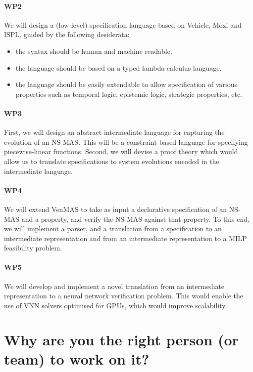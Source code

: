 \documentclass[11pt]{article}
\begin{document}
\paragraph{WP2} We will design a (low-level) specification language
based on Vehicle, Moxi and ISPL, guided by the following desiderata:
\begin{itemize}
\item the syntax should be human and machine readable.  
\item the language should be based on a typed lambda-calculus language.
\item the language should be easily extendable to allow specification
  of various properties such as temporal logic, epistemic logic,
  strategic properties, etc.
\end{itemize}

\paragraph{WP3}  First, we will design an abstract intermediate language
for capturing the evolution of an NS-MAS. This will be a
constraint-based language for specifying piecewise-linear
functions. Second, we will devise a proof theory which would allow us
to translate specifications to system evolutions encoded in the
intermediate language.

\paragraph{WP4}  We will extend VenMAS to take as input a declarative
specification of an NS-MAS and a property, and verify the NS-MAS
against that property. To this end, we will implement a parser, and a
translation from a specification to an intermediate representation
and from an intermediate representation to a MILP feasibility problem.

\paragraph{WP5} We will develop and implement a novel translation from
an intermediate representation to a neural network verification
problem. This would enable the use of VNN solvers optimised for GPUs,
which would improve scalability.

\section{Why are you the right person (or
team) to work on it?}
\end{document}
